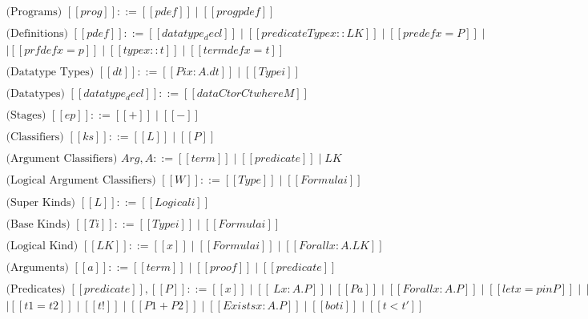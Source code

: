 \begin{center}
  \small
  \begin{math}
    \begin{array}{llllllllllllllll}
      \text{(Programs) }    [[prog]] ::= [[pdef]] \mid [[prog pdef]]\\
      \\
      \text{(Definitions) } [[pdef]] ::= [[datatype_decl]] \mid [[predicateType x :: LK]] \mid
      [[predef x = P]] \mid \\
      [[theorem x :: P]] \mid [[prfdef x = p]] \mid [[type x :: t]] \mid [[termdef x = t]] \\
      \\
      \text{(Datatype Types) } [[dt]] ::= [[Pi x : A . dt]] \mid [[Type i]]\\
      \\
      \text{(Datatypes) }   [[datatype_decl]] ::= [[data Ctor C t where M]]\\
      \\
      \text{(Stages) }      [[ep]]   ::= [[+]] \mid [[-]]\\
      \\
      \text{(Classifiers) } [[ks]]   ::= [[L]] \mid [[P]]\\
      \\
      \text{(Argument Classifiers) } Arg, A ::= [[term]] \mid [[predicate]] \mid LK\\
      \\
      \text{(Logical Argument Classifiers) } [[W]] ::= [[Type]] \mid [[Formula i]]\\
      \\
      \text{(Super Kinds) } [[L]] ::= [[Logical i]]\\
      \\
      \text{(Base Kinds) }  [[Ti]] ::= [[Type i]] \mid [[Formula i]]\\
      \\
      \text{(Logical Kind) } [[LK]] ::= [[x]] \mid [[Formula i]] \mid [[Forall x : A.LK]]\\
      \\
      \text{(Arguments) } [[a]] ::= [[term]] \mid [[proof]] \mid [[predicate]]\\
      \\
      \text{(Predicates) } [[predicate]], [[P]] ::= [[x]] \mid [[\ L x : A . P]] \mid [[P a]] \mid [[Forall x : A . P]] \mid [[let x = p in P]] \mid [[let x = P in P']] \mid \\
      [[let x = t [ p ] in P]] \mid [[t1 = t2]] \mid [[t !]] \mid [[P1 + P2]] \mid [[Exists x : A . P]] \mid [[bot i]] \mid [[t < t']] \\

\end{array}
\end{math}
\end{center}
